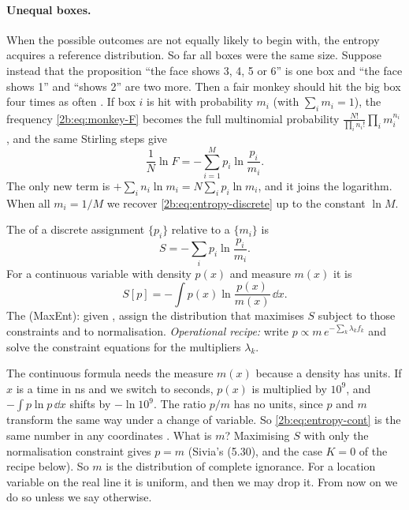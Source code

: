 \paragraph{Unequal boxes.} When the possible outcomes are not equally likely to begin with, the entropy acquires a reference distribution. So far all boxes were the same size. Suppose instead that the proposition ``the face shows 3, 4, 5 or 6'' is one box and ``the face shows 1'' and ``shows 2'' are two more. Then a fair monkey should hit the big box four times as often . If box $i$ is hit with probability $m_i$ (with $\sum_i m_i=1$), the frequency \eqref{2b:eq:monkey-F} becomes the full multinomial probability $\frac{N!}{\prod_i n_i!}\prod_i m_i^{n_i}$, and the same Stirling steps give
\begin{equation}
  \frac1N\ln F=-\sum_{i=1}^M p_i\ln\frac{p_i}{m_i} .
  \label{2b:eq:entropy-measure}
\end{equation}
The only new term is $+\sum_i n_i\ln m_i=N\sum_ip_i\ln m_i$, and it joins the logarithm. When all $m_i=1/M$ we recover \eqref{2b:eq:entropy-discrete} up to the constant $\ln M$.

\begin{workdef}
The  of a discrete assignment $\{p_i\}$ relative to a  $\{m_i\}$  is
\[
  S=-\sum_i p_i\ln\frac{p_i}{m_i}.
\]
For a continuous variable with density $p(x)$ and measure $m(x)$ it is 
\begin{equation}
  S[p]=-\int p(x)\ln\frac{p(x)}{m(x)}\,\dd x .
  \label{2b:eq:entropy-cont}
\end{equation}
The  (MaxEnt): given  , assign the distribution that maximises $S$ subject to those constraints and to normalisation.
\emph{Operational recipe:} write $p\propto m\,e^{-\sum_k\lambda_kf_k}$ and solve the constraint equations for the multipliers $\lambda_k$.
\end{workdef}

The continuous formula needs the measure $m(x)$ because a density has units. If $x$ is a time in ns and we switch to seconds, $p(x)$ is multiplied by $10^9$, and $-\int p\ln p\,\dd x$ shifts by $-\ln 10^9$. The ratio $p/m$ has no units, since $p$ and $m$ transform the same way under a change of variable. So \eqref{2b:eq:entropy-cont} is the same number in any coordinates . What is $m$? Maximising $S$ with only the normalisation constraint gives $p=m$ (Sivia's (5.30), and the case $K=0$ of the recipe below). So $m$ is the distribution of complete ignorance. For a location variable on the real line it is uniform, and then we may drop it. From now on we do so unless we say otherwise.

